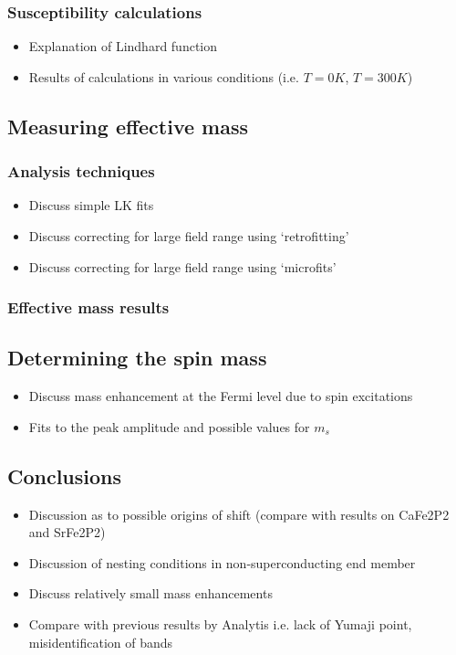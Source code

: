 \documentclass[11pt, a4paper]{article}
\begin{document}
        \subsubsection{Susceptibility calculations}
            \begin{itemize}
                \item Explanation of Lindhard function
                \item Results of calculations in various conditions (i.e. $T=0\unit{K}$, $T=300\unit{K}$)
            \end{itemize}    

    \subsection{Measuring effective mass}
        \subsubsection{Analysis techniques}
            \begin{itemize}
                \item Discuss simple LK fits
                \item Discuss correcting for large field range using `retrofitting'
                \item Discuss correcting for large field range using `microfits'
            \end{itemize}
        \subsubsection{Effective mass results}

    \subsection{Determining the spin mass}
        \begin{itemize}
            \item Discuss mass enhancement at the Fermi level due to spin excitations
            \item Fits to the peak amplitude and possible values for $m_{s}$
        \end{itemize}
            

    \subsection{Conclusions}
        \begin{itemize}
            \item Discussion as to possible origins of shift (compare with results on CaFe2P2 and SrFe2P2)
            \item Discussion of nesting conditions in non-superconducting end member
            \item Discuss relatively small mass enhancements
            \item Compare with previous results by Analytis \etal{} i.e. lack of Yumaji point, misidentification of bands        
        \end{itemize}
\end{document}
